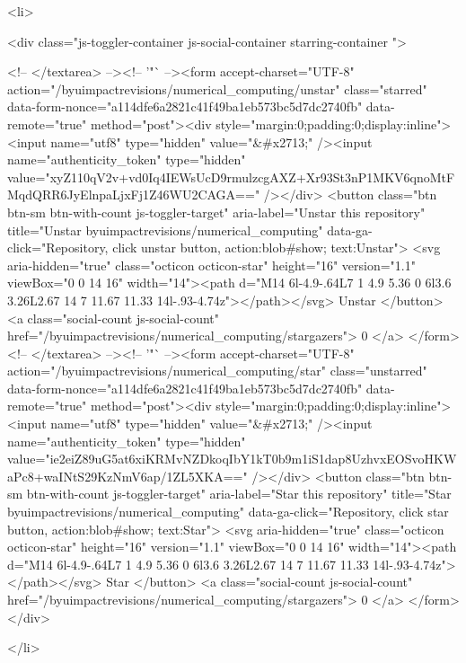   <li>
    
  <div class="js-toggler-container js-social-container starring-container ">

    <!-- </textarea> --><!-- '"` --><form accept-charset="UTF-8" action="/byuimpactrevisions/numerical_computing/unstar" class="starred" data-form-nonce="a114dfe6a2821c41f49ba1eb573bc5d7dc2740fb" data-remote="true" method="post"><div style="margin:0;padding:0;display:inline"><input name="utf8" type="hidden" value="&#x2713;" /><input name="authenticity_token" type="hidden" value="xyZ110qV2v+vd0Iq4IEWsUcD9rmulzcgAXZ+Xr93St3nP1MKV6qnoMtFMqdQRR6JyElnpaLjxFj1Z46WU2CAGA==" /></div>
      <button
        class="btn btn-sm btn-with-count js-toggler-target"
        aria-label="Unstar this repository" title="Unstar byuimpactrevisions/numerical_computing"
        data-ga-click="Repository, click unstar button, action:blob#show; text:Unstar">
        <svg aria-hidden="true" class="octicon octicon-star" height="16" version="1.1" viewBox="0 0 14 16" width="14"><path d="M14 6l-4.9-.64L7 1 4.9 5.36 0 6l3.6 3.26L2.67 14 7 11.67 11.33 14l-.93-4.74z"></path></svg>
        Unstar
      </button>
        <a class="social-count js-social-count" href="/byuimpactrevisions/numerical_computing/stargazers">
          0
        </a>
</form>
    <!-- </textarea> --><!-- '"` --><form accept-charset="UTF-8" action="/byuimpactrevisions/numerical_computing/star" class="unstarred" data-form-nonce="a114dfe6a2821c41f49ba1eb573bc5d7dc2740fb" data-remote="true" method="post"><div style="margin:0;padding:0;display:inline"><input name="utf8" type="hidden" value="&#x2713;" /><input name="authenticity_token" type="hidden" value="ie2eiZ89uG5at6xiKRMvNZDkoqIbY1kT0b9m1iS1dap8UzhvxEOSvoHKWaPc8+waINtS29KzNmV6ap/1ZL5XKA==" /></div>
      <button
        class="btn btn-sm btn-with-count js-toggler-target"
        aria-label="Star this repository" title="Star byuimpactrevisions/numerical_computing"
        data-ga-click="Repository, click star button, action:blob#show; text:Star">
        <svg aria-hidden="true" class="octicon octicon-star" height="16" version="1.1" viewBox="0 0 14 16" width="14"><path d="M14 6l-4.9-.64L7 1 4.9 5.36 0 6l3.6 3.26L2.67 14 7 11.67 11.33 14l-.93-4.74z"></path></svg>
        Star
      </button>
        <a class="social-count js-social-count" href="/byuimpactrevisions/numerical_computing/stargazers">
          0
        </a>
</form>  </div>

  </li>

